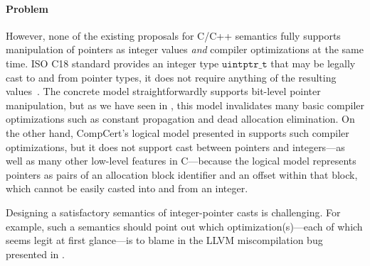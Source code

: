 


\paragraph{Problem}


However, none of the existing proposals for C/C++ semantics fully supports manipulation of pointers
as integer values \emph{and} compiler optimizations at the same time.  ISO C18 standard provides an
integer type $\mathtt{uintptr\_t}$ that may be legally cast to and from pointer types, it does not
require anything of the resulting values~\cite[\S7.20.1.4p1]{c18}.  The concrete model
straightforwardly supports bit-level pointer manipulation, but as we have seen in
, this model invalidates many basic compiler
optimizations such as constant propagation and dead allocation elimination.  On the other hand,
CompCert's logical model presented in  supports such
compiler optimizations, but it does not support cast between pointers and integers---as well as many
other low-level features in C---because the logical model represents pointers as pairs of an
allocation block identifier and an offset within that block, which cannot be easily casted into and
from an integer.




Designing a satisfactory semantics of integer-pointer casts is challenging.  For example, such a
semantics should point out which optimization(s)---each of which seems legit at first glance---is to
blame in the LLVM miscompilation bug presented in .


